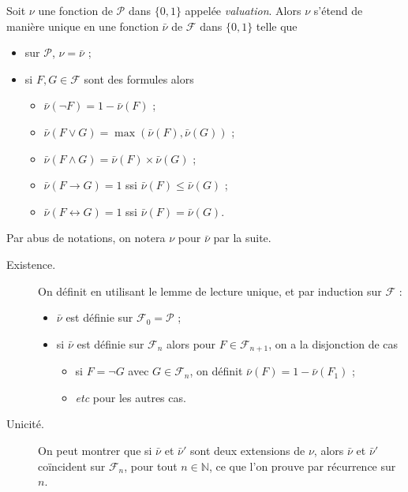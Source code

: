 \documentclass[./main]{subfiles}
\begin{document}
  \begin{lem}
    Soit $\nu$ une fonction de $\mathcal{P}$ dans $\{0,1\}$ appelée \textit{valuation}.
    Alors $\nu$ s'étend de manière unique en une fonction $\bar{\nu}$ de $\mathcal{F}$ dans $\{0,1\}$ telle que 
    \begin{itemize}
      \item sur $\mathcal{P}$, $\nu = \bar{\nu}$ ;
      \item si $F, G \in \mathcal{F}$ sont des formules alors 
        \begin{itemize}
          \item $\bar{\nu}(\lnot F) = 1 - \bar{\nu}(F)$ ;
          \item $\bar{\nu}(F \lor G) = \max(\bar{\nu}(F), \bar{\nu}(G))$ ;
          \item $\bar{\nu}(F \land G) = \bar{\nu}(F) \times \bar{\nu}(G)$ ;
          \item $\bar{\nu}(F \to G) = 1$ ssi $\bar{\nu}(F) \le \bar{\nu}(G)$ ;
          \item $\bar{\nu}(F \leftrightarrow G) = 1$ ssi $\bar{\nu}(F) = \bar{\nu}(G)$.
        \end{itemize}
    \end{itemize}
    Par abus de notations, on notera $\nu$ pour $\bar{\nu}$ par la suite.
  \end{lem}
  \begin{prv}
    \begin{description}
      \item[Existence.]
        On définit en utilisant le lemme de lecture unique, et par induction sur $\mathcal{F}$ :
        \begin{itemize}
          \item $\bar{\nu}$ est définie sur $\mathcal{F}_0 = \mathcal{P}$ ;
          \item si $\bar{\nu}$ est définie sur $\mathcal{F}_n$ alors pour $F \in \mathcal{F}_{n+1}$, on a la disjonction de cas
            \begin{itemize}
              \item si $F = \lnot G$ avec $G \in \mathcal{F}_n$, on définit $\bar{\nu}(F) = 1 - \bar{\nu}(F_1)$ ;
              \item \textit{etc} pour les autres cas.
            \end{itemize}
        \end{itemize}
      \item[Unicité.]
        On peut montrer que si $\bar{\nu}$ et $\bar{\nu}'$ sont deux extensions de $\nu$, alors $\bar{\nu}$ et $\bar{\nu}'$ coïncident sur $\mathcal{F}_n$, pour tout $n \in \mathds{N}$, ce que l'on prouve par récurrence sur $n$.
    \end{description}
  \end{prv}
\end{document}
